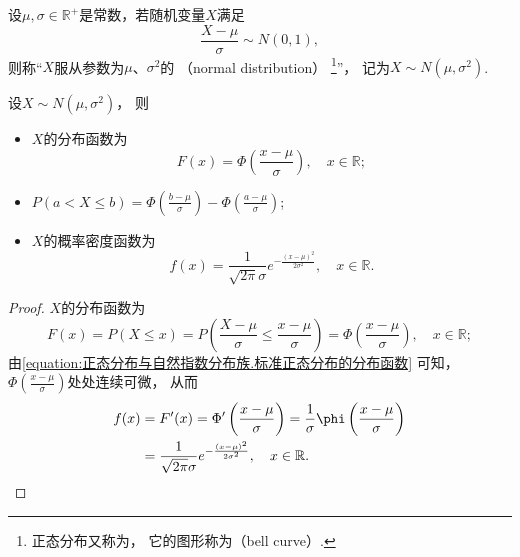 \begin{definition}\label{definition:正态分布.正态分布的定义}
设\(\mu,\sigma\in\mathbb{R}^+\)是常数，若随机变量\(X\)满足\[
	\frac{X-\mu}{\sigma} \sim N(0,1),
\]
则称“\(X\)服从参数为\(\mu\)、\(\sigma^2\)的%
（normal distribution）%
\footnote{正态分布又称为，
它的图形称为（bell curve）.}”，
记为\(X \sim N(\mu,\sigma^2)\).
\end{definition}

\begin{theorem}
设\(X \sim N(\mu,\sigma^2)\)，
则\begin{itemize}
	\item \(X\)的分布函数为\[
		F(x) = \Phi\left(\frac{x-\mu}{\sigma}\right),
		\quad x\in\mathbb{R};
	\]
	\item \(P(a < X \leq b) = \Phi\left(\frac{b-\mu}{\sigma}\right) - \Phi\left(\frac{a-\mu}{\sigma}\right)\);
	\item \(X\)的概率密度函数为\[
		f(x) = \frac{1}{\sqrt{2 \pi} \sigma} e^{-\frac{(x-\mu)^2}{2\sigma^2}},
		\quad x\in\mathbb{R}.
	\]
\end{itemize}
\begin{proof}
\(X\)的分布函数为\[
	F(x) = P(X \leq x)
	= P\left(\frac{X-\mu}{\sigma}\leq\frac{x-\mu}{\sigma}\right)
	= \Phi\left(\frac{x-\mu}{\sigma}\right), \quad x\in\mathbb{R};
\]
由\cref{equation:正态分布与自然指数分布族.标准正态分布的分布函数} 可知，
\(\Phi\left(\frac{x-\mu}{\sigma}\right)\)处处连续可微，
从而\begin{align*}
	f(x) &= F'(x) = \Phi'\left(\frac{x-\mu}{\sigma}\right)
	= \frac{1}{\sigma} \phi\left(\frac{x-\mu}{\sigma}\right) \\
	&= \frac{1}{\sqrt{2 \pi} \sigma} e^{-\frac{(x-\mu)^2}{2\sigma^2}},
	\quad x\in\mathbb{R}.
	\qedhere
\end{align*}
\end{proof}
\end{theorem}

